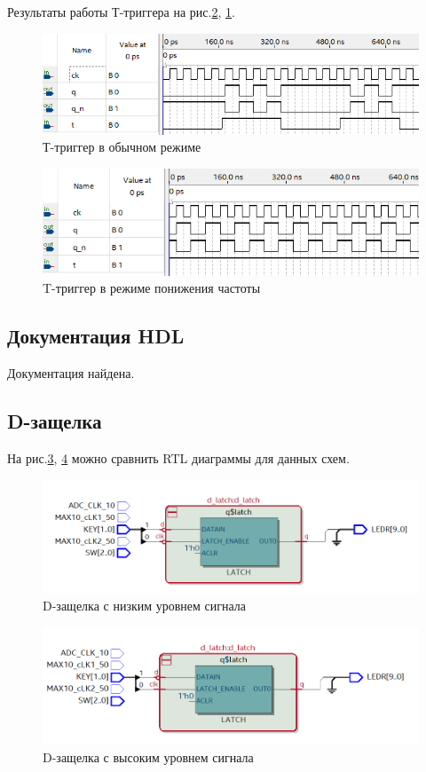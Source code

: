 \documentclass[a4paper,14pt]{article}
\begin{document}
Результаты работы Т-триггера на рис.\ref{fig:t_wave2}, \ref{fig:t_wave_sync}.
\begin{figure}[H]
	\centering
	\includegraphics[width=0.7\linewidth]{imgs/t_wave_sync}
	\caption{Т-триггер в обычном режиме}
	\label{fig:t_wave_sync}
\end{figure}

\begin{figure}[H]
	\centering
	\includegraphics[width=0.7\linewidth]{imgs/t_wave2}
	\caption{T-триггер в режиме понижения частоты}
	\label{fig:t_wave2}
\end{figure}

\subsection{Документация HDL}

Документация найдена\cite{citekey}.

\subsection{D-защелка}


На рис.\ref{fig:4_RTL_norm}, \ref{fig:4_RTL_inv} можно сравнить RTL диаграммы для данных схем.

\begin{figure}[H]
	\centering
	\includegraphics[width=0.7\linewidth]{imgs/4_RTL_norm}
	\caption{D-защелка с низким уровнем сигнала}
	\label{fig:4_RTL_norm}
\end{figure}

\begin{figure}[H]
	\centering
	\includegraphics[width=0.7\linewidth]{imgs/4_RTL_inv}
	\caption{D-защелка с высоким уровнем сигнала}
	\label{fig:4_RTL_inv}
\end{figure}
\end{document}
